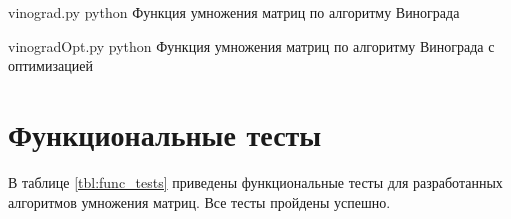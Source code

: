 \clearpage

{vinograd.py} %
{python} %
{Функция умножения матриц по алгоритму Винограда} %

\clearpage

{vinogradOpt.py} %
{python} %
{Функция умножения матриц по алгоритму Винограда с оптимизацией} %

\clearpage

\section{Функциональные тесты}

В таблице \ref{tbl:func_tests} приведены функциональные тесты для разработанных алгоритмов умножения матриц. Все тесты пройдены успешно.

